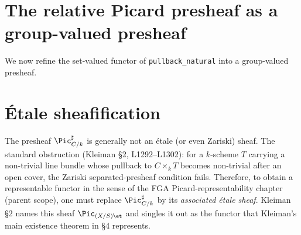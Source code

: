 \section{The relative Picard presheaf as a group-valued presheaf}
\label{sec:relpic_groupvalued}

We now refine the set-valued functor of \texttt{pullback\_natural} into a
group-valued presheaf.


\section{\'Etale sheafification}
\label{sec:relpic_etale_sheaf}

The presheaf \(\Pic^\sharp_{C/k}\) is generally not an \'etale (or even Zariski)
sheaf. The standard obstruction (Kleiman \S 2, L1292--L1302): for a \(k\)-scheme
\(T\) carrying a non-trivial line bundle whose pullback to \(C \times_k T\) becomes
non-trivial after an open cover, the Zariski separated-presheaf condition
fails. Therefore, to obtain a representable functor in the sense of
the FGA Picard-representability chapter (parent scope), one must replace
\(\Pic^\sharp_{C/k}\) by its \emph{associated \'etale sheaf}. Kleiman \S 2 names
this sheaf \(\Pic_{(X/S)\et}\) and singles it out as the functor that Kleiman's
main existence theorem in \S 4 represents.

